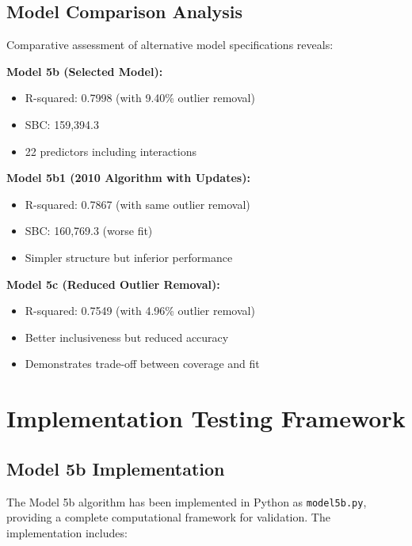 \subsection{Model Comparison Analysis}

Comparative assessment of alternative model specifications reveals:

\textbf{Model 5b (Selected Model):}
\begin{itemize}
    \item R-squared: 0.7998 (with 9.40\% outlier removal)
    \item SBC: 159,394.3
    \item 22 predictors including interactions
\end{itemize}

\textbf{Model 5b1 (2010 Algorithm with Updates):}
\begin{itemize}
    \item R-squared: 0.7867 (with same outlier removal)
    \item SBC: 160,769.3 (worse fit)
    \item Simpler structure but inferior performance
\end{itemize}

\textbf{Model 5c (Reduced Outlier Removal):}
\begin{itemize}
    \item R-squared: 0.7549 (with 4.96\% outlier removal)
    \item Better inclusiveness but reduced accuracy
    \item Demonstrates trade-off between coverage and fit
\end{itemize}

\section{Implementation Testing Framework}

\subsection{Model 5b Implementation}

The Model 5b algorithm has been implemented in Python as \texttt{model5b.py}, providing a complete computational framework for validation. The implementation includes:

